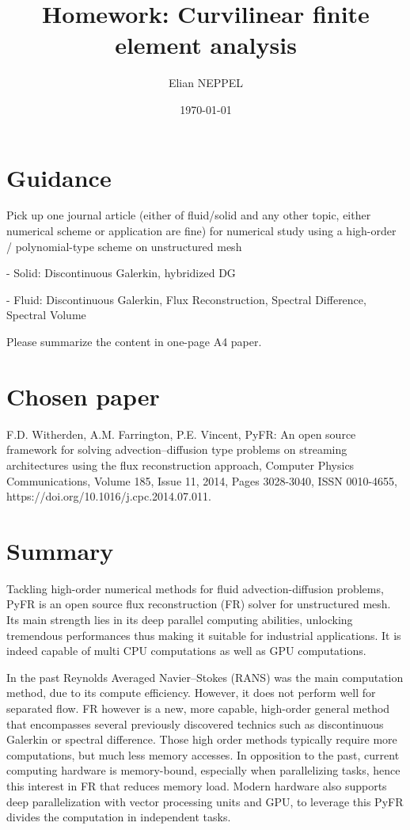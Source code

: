 \documentclass[12pt]{article}
\title{Homework: Curvilinear finite element analysis}
\author{Elian NEPPEL}
\date{\today}
\begin{document}
\maketitle

\section*{Guidance}

Pick up one journal article (either of fluid/solid and any other topic, either numerical scheme or application are fine) for numerical study using a high-order / polynomial-type scheme on unstructured mesh

- Solid: Discontinuous Galerkin, hybridized DG

- Fluid: Discontinuous Galerkin, Flux Reconstruction, Spectral Difference, Spectral Volume

Please summarize the content in one-page A4 paper.

\section*{Chosen paper}

F.D. Witherden, A.M. Farrington, P.E. Vincent,
PyFR: An open source framework for solving advection–diffusion type problems on streaming architectures using the flux reconstruction approach,
Computer Physics Communications,
Volume 185, Issue 11,
2014,
Pages 3028-3040,
ISSN 0010-4655,
https://doi.org/10.1016/j.cpc.2014.07.011.

\newpage
\section{Summary}

Tackling high-order numerical methods for fluid advection-diffusion problems, PyFR is an open source flux reconstruction (FR) solver for unstructured mesh.
Its main strength lies in its deep parallel computing abilities, unlocking tremendous performances thus making it suitable for industrial applications. It is indeed capable of multi CPU computations as well as GPU computations.

In the past Reynolds Averaged Navier–Stokes (RANS) was the main computation method, due to its compute efficiency. However, it does not perform well for separated flow.
FR however is a new, more capable, high-order general method that encompasses several previously discovered technics such as discontinuous Galerkin or spectral difference. Those high order methods typically require more computations, but much less memory accesses. In opposition to the past, current computing hardware is memory-bound, especially when parallelizing tasks, hence this interest in FR that reduces memory load. Modern hardware also supports deep parallelization with vector processing units and GPU, to leverage this PyFR divides the computation in independent tasks.
\end{document}
